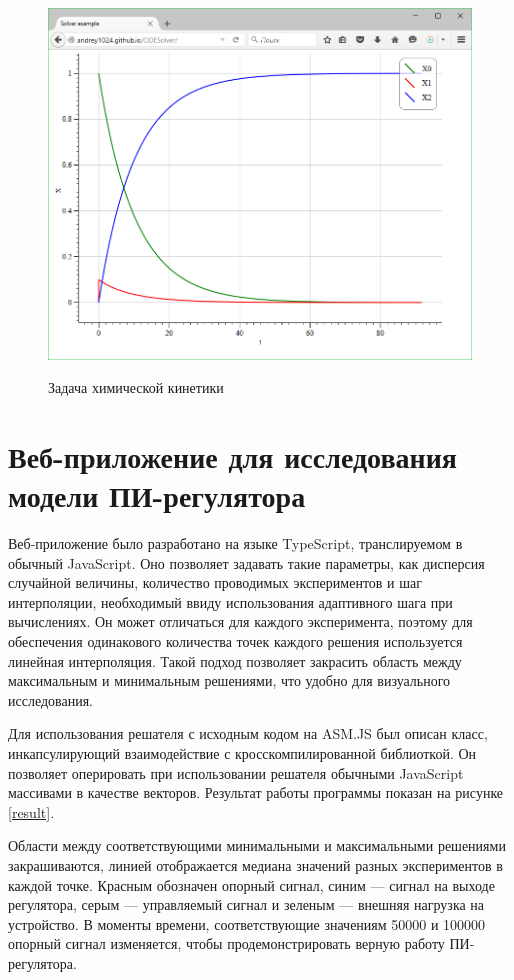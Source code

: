 \documentclass[oneside,final,14pt]{extreport}
\begin{document}
\begin{figure}[h]
	\centering
\	\includegraphics[width=1\textwidth]{graph}
	\caption{Задача химической кинетики}
	\label{graph}
\end{figure}



\section{Веб-приложение для исследования модели ПИ-регулятора}
Веб-приложение было разработано на языке TypeScript, транслируемом в обычный JavaScript. Оно позволяет задавать такие параметры, как дисперсия случайной величины, количество проводимых экспериментов и шаг интерполяции, необходимый ввиду использования адаптивного шага при вычислениях. Он может отличаться для каждого эксперимента, поэтому для  обеспечения одинакового количества точек каждого решения используется линейная интерполяция.  Такой подход позволяет закрасить область между максимальным и минимальным решениями, что удобно для визуального исследования.

 Для использования решателя с исходным кодом на ASM.JS был описан класс, инкапсулирующий взаимодействие с кросскомпилированной библиоткой. Он позволяет оперировать при использовании решателя обычными JavaScript массивами в качестве векторов. Результат работы программы показан на рисунке \ref{result}. 
 
 Области между соответствующими минимальными и максимальными решениями закрашиваются, линией отображается медиана значений разных экспериментов в каждой точке. Красным обозначен опорный сигнал, синим --- сигнал на выходе регулятора, серым --- управляемый сигнал и зеленым --- внешняя нагрузка на устройство. В моменты времени, соответствующие значениям 50000 и 100000 опорный сигнал изменяется, чтобы продемонстрировать верную работу ПИ-регулятора.
\end{document}
